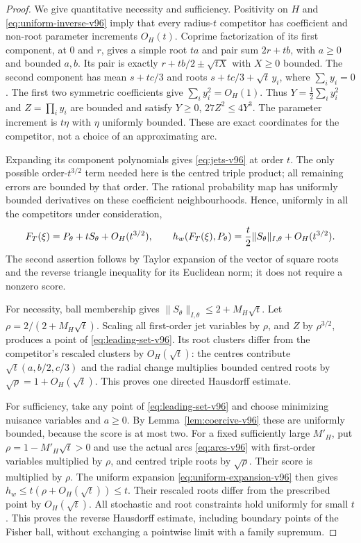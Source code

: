 \begin{proof}
We give quantitative necessity and sufficiency. Positivity on $H$ and
\eqref{eq:uniform-inverse-v96} imply that every radius-$t$ competitor
has coefficient and non-root parameter increments $O_H(t)$.
Coprime factorization of its first component, at $0$ and $r$, gives
a simple root $ta$ and pair sum $2r+tb$, with $a\ge0$ and bounded
$a,b$. Its pair is exactly $r+tb/2\pm\sqrt{tX}$ with $X\ge0$ bounded.
The second component has mean $s+tc/3$ and roots
$s+tc/3+\sqrt t\,y_i$, where $\sum_i y_i=0$.
The first two symmetric coefficients give $\sum_i y_i^2=O_H(1)$.
Thus $Y=\frac12\sum_i y_i^2$ and $Z=\prod_i y_i$ are bounded and
satisfy $Y\ge0$, $27Z^2\le4Y^3$. The parameter increment is $t\eta$
with $\eta$ uniformly bounded. These are exact coordinates for the
competitor, not a choice of an approximating arc.

Expanding its component polynomials gives \eqref{eq:jets-v96} at
order $t$. The only possible order-$t^{3/2}$ term needed here is the
centred triple product; all remaining errors are bounded by that order.
The rational probability map has uniformly bounded derivatives on
these coefficient neighbourhoods. Hence, uniformly in all the
competitors under consideration,
\begin{equation}\label{eq:uniform-expansion-v96}
 F_T(\xi)=P_\theta+tS_\theta+O_H(t^{3/2}),\qquad
 h_w(F_T(\xi),P_\theta)
       ={t\over2}\|S_\theta\|_{I,\theta}+O_H(t^{3/2}).
\end{equation}
The second assertion follows by Taylor expansion of the vector of
square roots and the reverse triangle inequality for its Euclidean
norm; it does not require a nonzero score.

For necessity, ball membership gives $\|S_\theta\|_{I,\theta}
\le2+M_H\sqrt t$. Let $\rho=2/(2+M_H\sqrt t)$. Scaling all first-order
jet variables by $\rho$, and $Z$ by $\rho^{3/2}$, produces a point of
\eqref{eq:leading-set-v96}. Its root clusters differ from the
competitor's rescaled clusters by $O_H(\sqrt t)$: the centres contribute
$\sqrt t(a,b/2,c/3)$ and the radial change multiplies bounded centred
roots by $\sqrt\rho=1+O_H(\sqrt t)$. This proves one directed
Hausdorff estimate.

For sufficiency, take any point of \eqref{eq:leading-set-v96} and
choose minimizing nuisance variables and $a\ge0$. By
Lemma~\ref{lem:coercive-v96} these are uniformly bounded, because the
score is at most two. For a fixed sufficiently large $M'_H$, put
$\rho=1-M'_H\sqrt t>0$ and use the actual arcs \eqref{eq:arcs-v96}
with first-order variables multiplied by $\rho$, and centred triple
roots by $\sqrt\rho$. Their score is multiplied by $\rho$.
The uniform expansion \eqref{eq:uniform-expansion-v96} then gives
$h_w\le t(\rho+O_H(\sqrt t))\le t$. Their rescaled roots differ
from the prescribed point by $O_H(\sqrt t)$. All stochastic and root
constraints hold uniformly for small $t$. This proves the reverse
Hausdorff estimate, including boundary points of the Fisher ball,
without exchanging a pointwise limit with a family supremum.


\end{proof}
